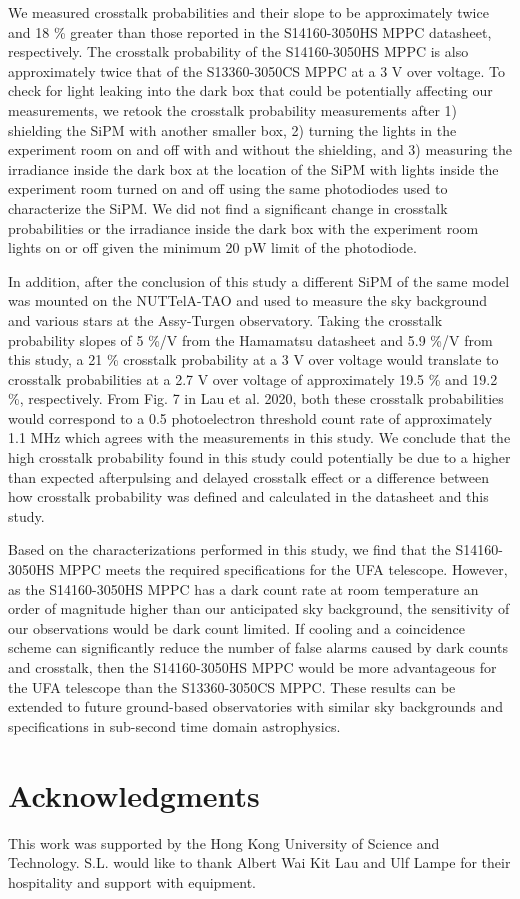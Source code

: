 \documentclass{article}
\begin{document}
We measured crosstalk probabilities and their slope to be approximately twice and 18 \% greater than those reported in the S14160-3050HS MPPC datasheet,\cite{hamamtsu2016s13360} respectively. The crosstalk probability of the S14160-3050HS MPPC is also approximately twice that of the S13360-3050CS MPPC at a 3 V over voltage.\cite{li2019characterization} To check for light leaking into the dark box that could be potentially affecting our measurements, we retook the crosstalk probability measurements after 1) shielding the SiPM with another smaller box, 2) turning the lights in the experiment room on and off with and without the shielding, and 3) measuring the irradiance inside the dark box at the location of the SiPM with lights inside the experiment room turned on and off using the same photodiodes used to characterize the SiPM. We did not find a significant change in crosstalk probabilities or the irradiance inside the dark box with the experiment room lights on or off given the minimum 20 pW limit of the photodiode.

In addition, after the conclusion of this study a different SiPM of the same model was mounted on the NUTTelA-TAO and used to measure the sky background and various stars at the Assy-Turgen observatory.\cite{lau2020sky} Taking the crosstalk probability slopes of 5 \%/V from the Hamamatsu datasheet\cite{hamamtsu2016s13360} and 5.9 \%/V from this study, a 21 \% crosstalk probability at a 3 V over voltage would translate to crosstalk probabilities at a 2.7 V over voltage of approximately 19.5 \% and 19.2 \%, respectively. From Fig. 7 in Lau et al. 2020,\cite{lau2020sky} both these crosstalk probabilities would correspond to a 0.5 photoelectron threshold count rate of approximately 1.1 MHz which agrees with the measurements in this study. We conclude that the high crosstalk probability found in this study could potentially be due to a higher than expected afterpulsing and delayed crosstalk effect or a difference between how crosstalk probability was defined and calculated in the datasheet and this study.

Based on the characterizations performed in this study, we find that the S14160-3050HS MPPC meets the required specifications for the UFA telescope. However, as the S14160-3050HS MPPC has a dark count rate at room temperature an order of magnitude higher than our anticipated sky background, the sensitivity of our observations would be dark count limited. If cooling and a coincidence scheme can significantly reduce the number of false alarms caused by dark counts and crosstalk, then the S14160-3050HS MPPC would be more advantageous for the UFA telescope than the S13360-3050CS MPPC. These results can be extended to future ground-based
observatories with similar sky backgrounds and specifications in sub-second time domain astrophysics.

\section*{Acknowledgments}
This work was supported by the Hong Kong University of Science and Technology. S.L. would like to thank Albert Wai Kit Lau and Ulf Lampe for their hospitality and support with equipment.




\end{document}
